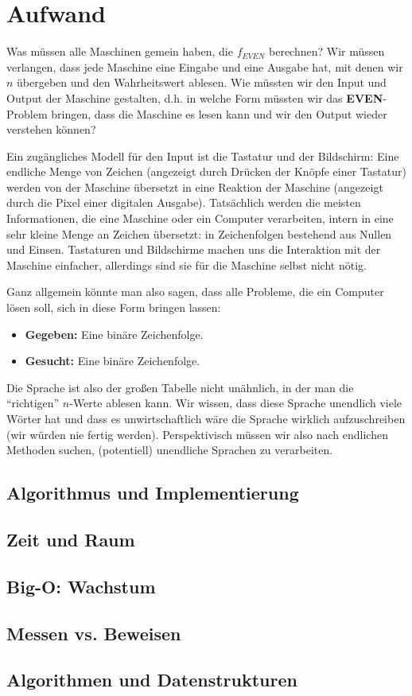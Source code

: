 \chapter{Aufwand}

 Was müssen alle Maschinen gemein haben, die $f_{EVEN}$ berechnen?
 Wir müssen verlangen,
 dass jede Maschine eine Eingabe und eine Ausgabe hat,
 mit denen wir $n$ übergeben und den Wahrheitswert ablesen.
 Wie müssten wir den Input und Output der Maschine gestalten,
 d.h. in welche Form müssten wir das \textbf{EVEN}-Problem bringen,
 dass die Maschine es lesen kann und wir den Output wieder verstehen können? 

 Ein zugängliches Modell für den Input ist die Tastatur und der Bildschirm:
 Eine endliche Menge von Zeichen (angezeigt durch Drücken der Knöpfe einer Tastatur)
 werden von der Maschine übersetzt in eine Reaktion der Maschine 
 (angezeigt durch die Pixel einer digitalen Ausgabe).
 Tatsächlich werden die meisten Informationen,
 die eine Maschine oder ein Computer verarbeiten,
 intern in eine sehr kleine Menge an Zeichen übersetzt:
 in Zeichenfolgen bestehend aus Nullen und Einsen.
 Tastaturen und Bildschirme machen uns die Interaktion mit der Maschine einfacher,
 allerdings sind sie für die Maschine selbst nicht nötig.

 Ganz allgemein könnte man also sagen, dass alle Probleme, die ein Computer lösen soll,
sich in diese Form bringen lassen:
 \begin{itemize}
    \item \textbf{Gegeben:} Eine binäre Zeichenfolge.
    \item \textbf{Gesucht:} Eine binäre Zeichenfolge.
 \end{itemize}

 Die Sprache ist also der großen Tabelle nicht unähnlich,
 in der man die ``richtigen'' $n$-Werte ablesen kann.
 Wir wissen, dass diese Sprache unendlich viele Wörter hat und dass es unwirtschaftlich wäre
 die Sprache wirklich aufzuschreiben (wir würden nie fertig werden).
 Perspektivisch müssen wir also nach endlichen Methoden suchen,
 (potentiell) unendliche Sprachen zu verarbeiten.

\section{Algorithmus und Implementierung}
\section{Zeit und Raum}
\section{Big-O: Wachstum}
\section{Messen vs. Beweisen}\label{messenVsBeweisen}
\section{Algorithmen und Datenstrukturen}
